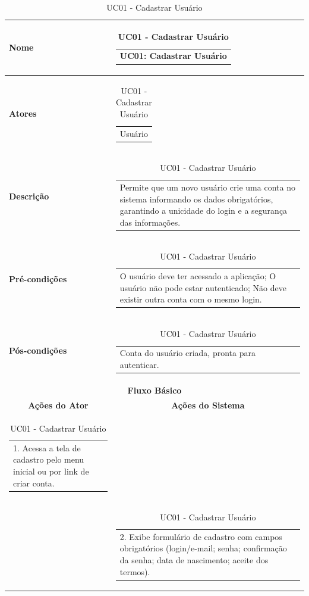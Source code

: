 \begin{longtable}[c]{|p{}|p{}|}
\caption{UC01 - Cadastrar Usuário}
\label{tab:uc01}\\
\hline
\multicolumn{1}{|p{0.48\textwidth}|}{\textbf{Nome}} &
  \begin{tabular}[c]{@{}p{}@{}}UC01: Cadastrar Usuário\end{tabular} \\ \hline
\endfirsthead
\endhead
\multicolumn{1}{|p{0.48\textwidth}|}{\textbf{Atores}} &
  \begin{tabular}[c]{@{}p{}@{}}Usuário\end{tabular} \\ \hline
\multicolumn{1}{|p{0.48\textwidth}|}{\textbf{Descrição}} &
  \begin{tabular}[c]{@{}p{}@{}}Permite que um novo usuário crie uma conta no sistema informando os dados obrigatórios, garantindo a unicidade do login e a segurança das informações.\end{tabular} \\ \hline
\multicolumn{1}{|p{0.48\textwidth}|}{\textbf{Pré-condições}} &
  \begin{tabular}[c]{@{}p{}@{}}O usuário deve ter acessado a aplicação; O usuário não pode estar autenticado; Não deve existir outra conta com o mesmo login.\end{tabular} \\ \hline
\multicolumn{1}{|p{0.48\textwidth}|}{\textbf{Pós-condições}} &
  \begin{tabular}[c]{@{}p{}@{}}Conta do usuário criada, pronta para autenticar.\end{tabular} \\ \hline
\multicolumn{2}{|c|}{\textbf{Fluxo Básico}} \\ \hline
\multicolumn{1}{|c|}{\textbf{Ações do Ator}} &
  \multicolumn{1}{c|}{\textbf{Ações do Sistema}} \\ \hline
\multicolumn{1}{|p{0.48\textwidth}|}{\begin{tabular}[c]{@{}p{}@{}}1. Acessa a tela de cadastro pelo menu inicial ou por link de criar conta.\end{tabular}} &
   \\ \hline
\multicolumn{1}{|p{0.48\textwidth}|}{} &
  \begin{tabular}[c]{@{}p{}@{}}2. Exibe formulário de cadastro com campos obrigatórios (login/e-mail; senha; confirmação da senha; data de nascimento; aceite dos termos).\end{tabular} \\ \hline

\end{longtable}

